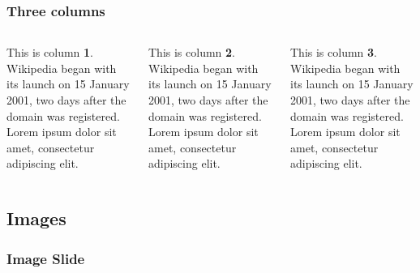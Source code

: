 \begin{frame}
	\frametitle{Three columns}
	\begin{columns}
		\begin{column}{0.30\textwidth}
			This is column \textbf{1}. Wikipedia began with its launch on 15 January 2001, two days after the domain was registered. Lorem ipsum dolor sit amet, consectetur adipiscing elit.
		\end{column}
		\begin{column}{0.30\textwidth}
			This is column \textbf{2}. Wikipedia began with its launch on 15 January 2001, two days after the domain was registered. Lorem ipsum dolor sit amet, consectetur adipiscing elit.
		\end{column}
		\begin{column}{0.30\textwidth}
			This is column \textbf{3}. Wikipedia began with its launch on 15 January 2001, two days after the domain was registered. Lorem ipsum dolor sit amet, consectetur adipiscing elit.
		\end{column}
	\end{columns}
\end{frame}


\subsection{Images}


\begin{frame}
	\frametitle{Image Slide}
\end{frame}


